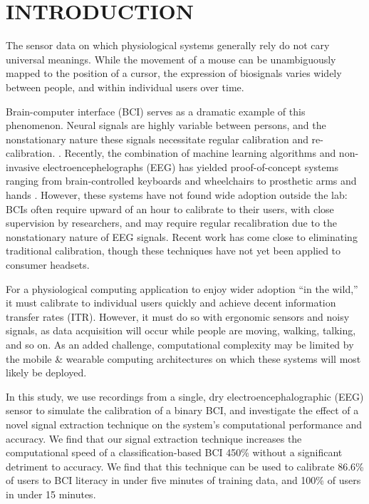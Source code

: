 \section{\uppercase{Introduction}}
\label{sec:introduction}

\noindent The sensor data on which physiological systems generally rely do not cary universal meanings. While the movement of a mouse can be unambiguously mapped to the position of a cursor, the expression of biosignals varies widely  between people, and within individual users over time. 

Brain-computer interface (BCI) serves as a dramatic example of this phenomenon. Neural signals are highly variable between persons, and the nonstationary nature these signals necessitate regular calibration and re-calibration. \cite{dornhege_toward_2007,mcfarland_brain-computer_2011}. Recently, the combination of machine learning algorithms and non-invasive electroencephelographs (EEG) has yielded proof-of-concept systems ranging from brain-controlled keyboards and wheelchairs to prosthetic arms and hands \cite{blankertz_note_2007,millan_combining_2010,d._mattia_brain_2011,hill_practical_2014,campbell_neurophone:_2010}. However, these systems have not found wide adoption outside the lab: BCIs often require upward of an hour to calibrate to their users, with close supervision by researchers, and may require regular recalibration due to the nonstationary nature of EEG signals. \cite{vidaurre_fully_2006,vidaurre_co-adaptive_2011,blankertz_non-invasive_2007} Recent work has come close to eliminating traditional calibration, though these techniques have not yet been applied to consumer headsets. \cite{kindermans_true_2014}

For a physiological computing application to enjoy wider adoption ``in the wild,'' it must calibrate to individual users quickly and achieve decent information transfer rates (ITR). However, it must do so with ergonomic sensors and noisy signals, as data acquisition will occur while people are moving, walking, talking, and so on. As an added challenge, computational complexity may be limited by the mobile \& wearable computing architectures on which these systems will most likely be deployed. 

In this study, we use recordings from a single, dry electroencephalographic (EEG) sensor to simulate the calibration of a binary BCI, and investigate the effect of a novel signal extraction technique on the system's computational performance and accuracy. We find that our signal extraction technique increases the computational speed of a classification-based BCI 450\% without a significant detriment to accuracy. We find that this technique can be used to calibrate 86.6\% of users to BCI literacy in under five minutes of training data, and 100\% of users in under 15 minutes. 